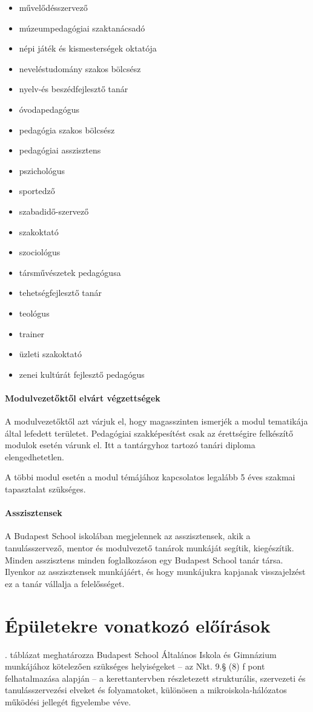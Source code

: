 \begin{itemize}
\item művelődésszervező
\item múzeumpedagógiai szaktanácsadó
\item népi játék és kismesterségek oktatója
\item neveléstudomány szakos bölcsész
\item nyelv-és beszédfejlesztő tanár
\item óvodapedagógus
\item pedagógia szakos bölcsész
\item pedagógiai asszisztens
\item pszichológus
\item sportedző
\item szabadidő-szervező
\item szakoktató
\item szociológus
\item társművészetek pedagógusa
\item tehetségfejlesztő tanár
\item teológus
\item trainer
\item üzleti szakoktató
\item zenei kultúrát fejlesztő pedagógus
\end{itemize}

\paragraph{Modulvezetőktől elvárt végzettségek}
A modulvezetőktől azt várjuk el, hogy magasszinten ismerjék a modul tematikája által lefedett területet. Pedagógiai szakképesítést csak az érettségire felkészítő modulok esetén várunk el. Itt a tantárgyhoz tartozó tanári diploma elengedhetetlen.

A többi modul esetén a modul témájához kapcsolatos legalább 5 éves szakmai tapasztalat szükséges.

\paragraph{Asszisztensek}
A Budapest School iskolában megjelennek az asszisztensek, akik a tanulásszervező, mentor és modulvezető tanárok munkáját segítik, kiegészítik. Minden asszisztens minden foglalkozáson egy Budapest School tanár társa. Ilyenkor az asszisztensek munkájáért, és hogy munkájukra kapjanak visszajelzést ez a tanár vállalja a felelősséget.


\section{Épületekre vonatkozó előírások}
. táblázat meghatározza Budapest School Általános Iskola és Gimnázium munkájához kötelezően szükséges helyiségeket -- az Nkt. 9.§ (8) f pont felhatalmazása alapján -- a kerettantervben részletezett strukturális, szervezeti és tanulásszervezési elveket és folyamatoket, különösen a mikroiskola-hálózatos működési jellegét figyelembe véve.


